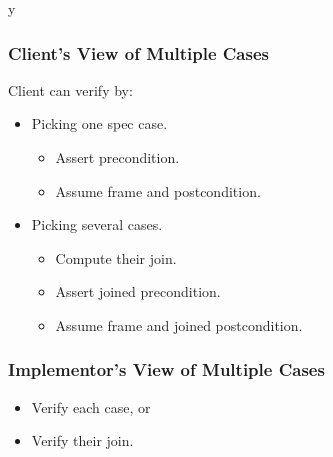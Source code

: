 \if y\MAKEHANDOUTS \documentclass[t,compress,landscape,handout]{beamer}
\begin{document}
\begin{frame}
\frametitle{Client's View of Multiple Cases}

Client can verify by:
\begin{itemize}
\item
Picking one spec case.
\begin{itemize}
\item
Assert precondition.

\item
Assume frame and postcondition.
\end{itemize}

\item
Picking several cases.
\begin{itemize}
\item
Compute their join.

\item
Assert joined precondition.

\item
Assume frame and joined postcondition.
\end{itemize}
\end{itemize}
\end{frame}

\begin{frame}
\frametitle{Implementor's View of Multiple Cases}

\begin{itemize}
\item
Verify each case, or

\item
Verify their join.
\end{itemize}
\end{frame}
\end{document}

